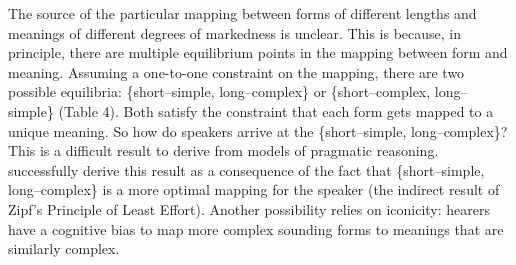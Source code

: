 \documentclass[man, noapacite, 12pt]{apa2}
\begin{document}

The source of the particular mapping between forms of different lengths and meanings of different degrees of markedness is unclear. This is because, in principle, there are multiple equilibrium points in the mapping between form and meaning. Assuming a one-to-one constraint on the mapping, there are two possible equilibria: \{short--simple, long--complex\} or \{short--complex, long--simple\} (Table 4). Both satisfy the constraint that each  form gets mapped to a unique meaning. So how do speakers arrive at the  \{short--simple, long--complex\}? This is a difficult result to derive from models of pragmatic reasoning.  successfully derive this result as a consequence of the fact that \{short--simple, long--complex\} is a more optimal mapping for the speaker (the indirect result of Zipf's Principle of Least Effort). Another possibility relies on iconicity: hearers have a cognitive bias to map more complex sounding forms to meanings that are similarly complex. 
\end{document}
